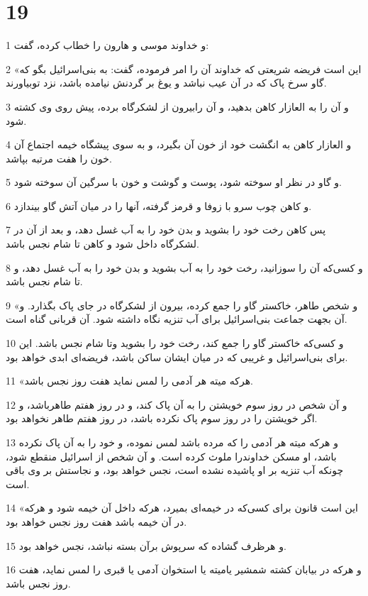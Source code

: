 \chapter{19}

\par 1 و خداوند موسی و هارون را خطاب کرده، گفت:
\par 2 «این است فریضه شریعتی که خداوند آن را امر فرموده، گفت: به بنی‌اسرائیل بگو که گاو سرخ پاک که در آن عیب نباشد و یوغ بر گردنش نیامده باشد، نزد توبیاورند.
\par 3 و آن را به العازار کاهن بدهید، و آن رابیرون از لشکرگاه برده، پیش روی وی کشته شود.
\par 4 و العازار کاهن به انگشت خود از خون آن بگیرد، و به سوی پیشگاه خیمه اجتماع آن خون را هفت مرتبه بپاشد.
\par 5 و گاو در نظر او سوخته شود، پوست و گوشت و خون با سرگین آن سوخته شود.
\par 6 و کاهن چوب سرو با زوفا و قرمز گرفته، آنها را در میان آتش گاو بیندازد.
\par 7 پس کاهن رخت خود را بشوید و بدن خود را به آب غسل دهد، و بعد از آن در لشکرگاه داخل شود و کاهن تا شام نجس باشد.
\par 8 و کسی‌که آن را سوزانید، رخت خود را به آب بشوید و بدن خود را به آب غسل دهد، و تا شام نجس باشد.
\par 9 «و شخص طاهر، خاکستر گاو را جمع کرده، بیرون از لشکرگاه در جای پاک بگذارد. و آن بجهت جماعت بنی‌اسرائیل برای آب تنزیه نگاه داشته شود. آن قربانی گناه است.
\par 10 و کسی‌که خاکستر گاو را جمع کند، رخت خود را بشوید وتا شام نجس باشد. این برای بنی‌اسرائیل و غریبی که در میان ایشان ساکن باشد، فریضه‌ای ابدی خواهد بود.
\par 11 «هرکه میته هر آدمی را لمس نماید هفت روز نجس باشد.
\par 12 و آن شخص در روز سوم خویشتن را به آن پاک کند، و در روز هفتم طاهرباشد، و اگر خویشتن را در روز سوم پاک نکرده باشد، در روز هفتم طاهر نخواهد بود.
\par 13 و هرکه میته هر آدمی را که مرده باشد لمس نموده، و خود را به آن پاک نکرده باشد، او مسکن خداوندرا ملوث کرده است. و آن شخص از اسرائیل منقطع شود، چونکه آب تنزیه بر او پاشیده نشده است، نجس خواهد بود، و نجاستش بر وی باقی است.
\par 14 «این است قانون برای کسی‌که در خیمه‌ای بمیرد، هرکه داخل آن خیمه شود و هرکه در آن خیمه باشد هفت روز نجس خواهد بود.
\par 15 و هرظرف گشاده که سرپوش برآن بسته نباشد، نجس خواهد بود.
\par 16 و هرکه در بیابان کشته شمشیر یامیته یا استخوان آدمی یا قبری را لمس نماید، هفت روز نجس باشد.
